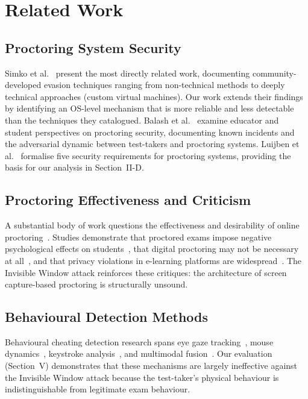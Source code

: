 \documentclass[conference]{IEEEtran}
\begin{document}
\section{Related Work}

\subsection{Proctoring System Security}

Simko et al.~\cite{simko2024modern} present the most directly related work, documenting community-developed evasion techniques ranging from non-technical methods to deeply technical approaches (custom virtual machines). Our work extends their findings by identifying an OS-level mechanism that is more reliable and less detectable than the techniques they catalogued. Balash et al.~\cite{balash2023educators,balash2021examining} examine educator and student perspectives on proctoring security, documenting known incidents and the adversarial dynamic between test-takers and proctoring systems. Luijben et al.~\cite{luijben2024security} formalise five security requirements for proctoring systems, providing the basis for our analysis in Section~II-D.

\subsection{Proctoring Effectiveness and Criticism}

A substantial body of work questions the effectiveness and desirability of online proctoring~\cite{lee2022online,johri2023students,khalil2022nexus,duncan2022necessity,paris2021sins,marano2024student,mukherjee2024balancing}. Studies demonstrate that proctored exams impose negative psychological effects on students~\cite{conijn2022fear}, that digital proctoring may not be necessary at all~\cite{duncan2022necessity}, and that privacy violations in e-learning platforms are widespread~\cite{paris2021sins}. The Invisible Window attack reinforces these critiques: the architecture of screen capture-based proctoring is structurally unsound.

\subsection{Behavioural Detection Methods}

Behavioural cheating detection research spans eye gaze tracking~\cite{kaddoura2023computational,ferdosi2023modeling}, mouse dynamics~\cite{dilini2021cheating,hu2019insider,wang2020user,lyu2022befp,yazici2022online}, keystroke analysis~\cite{lyu2022befp,yazici2022online}, and multimodal fusion~\cite{guan2021design,atoum2017automated}. Our evaluation (Section~V) demonstrates that these mechanisms are largely ineffective against the Invisible Window attack because the test-taker's physical behaviour is indistinguishable from legitimate exam behaviour.
\end{document}
